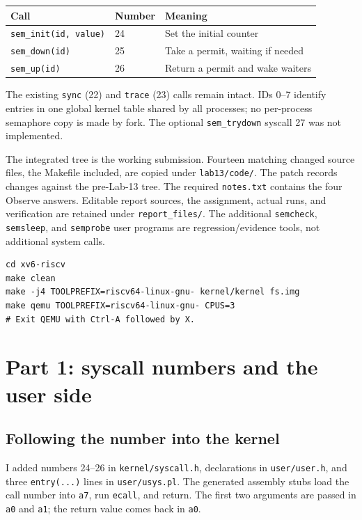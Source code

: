 \documentclass[12pt]{article}
\begin{document}
\begin{center}
\begin{tabular}{lll}
\toprule
Call & Number & Meaning \\
\midrule
\texttt{sem\_init(id, value)} & 24 & Set the initial counter \\
\texttt{sem\_down(id)} & 25 & Take a permit, waiting if needed \\
\texttt{sem\_up(id)} & 26 & Return a permit and wake waiters \\
\bottomrule
\end{tabular}
\end{center}
The existing \texttt{sync} (22) and \texttt{trace} (23) calls remain intact.
IDs 0--7 identify entries in one global kernel table shared by all
processes; no per-process semaphore copy is made by fork. The optional
\texttt{sem\_trydown} syscall 27 was not implemented.

The integrated tree is the working submission. Fourteen matching changed
source files, the Makefile included, are copied under \texttt{lab13/code/}.
The patch records changes against the pre-Lab-13 tree. The required
\texttt{notes.txt} contains the four Observe answers. Editable report
sources, the assignment, actual runs, and verification are retained under
\texttt{report\_files/}. The additional \texttt{semcheck}, \texttt{semsleep},
and \texttt{semprobe} user programs are regression/evidence tools, not
additional system calls.

\begin{lstlisting}
cd xv6-riscv
make clean
make -j4 TOOLPREFIX=riscv64-linux-gnu- kernel/kernel fs.img
make qemu TOOLPREFIX=riscv64-linux-gnu- CPUS=3
# Exit QEMU with Ctrl-A followed by X.
\end{lstlisting}

\clearpage
\section{Part 1: syscall numbers and the user side}
\subsection{Following the number into the kernel}
I added numbers 24--26 in \texttt{kernel/syscall.h}, declarations in
\texttt{user/user.h}, and three \texttt{entry(...)} lines in
\texttt{user/usys.pl}. The generated assembly stubs load the call number
into \texttt{a7}, run \texttt{ecall}, and return. The first two arguments
are passed in \texttt{a0} and \texttt{a1}; the return value comes back in
\texttt{a0}.
\end{document}
